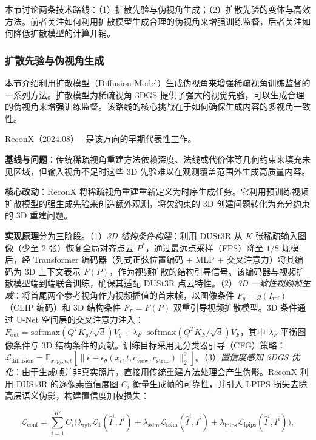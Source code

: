 本节讨论两条技术路线：（1）扩散先验与伪视角生成；（2）扩散先验的变体与高效方法。前者关注如何利用扩散模型生成合理的伪视角来增强训练监督，后者关注如何降低扩散模型的计算开销。

\subsubsection{扩散先验与伪视角生成}

本节介绍利用扩散模型（Diffusion Model）生成伪视角来增强稀疏视角训练监督的一系列方法。扩散模型为稀疏视角 3DGS 提供了强大的视觉先验，可以生成合理的伪视角来增强训练监督。该路线的核心挑战在于如何确保生成内容的多视角一致性。

ReconX（2024.08）~\cite{2408_16767} 是该方向的早期代表性工作。

\textbf{基线与问题}：传统稀疏视角重建方法依赖深度、法线或代价体等几何约束来填充未见区域，但输入视角不足时这些 3D 先验难以在观测覆盖范围外生成高质量内容。

\textbf{核心改动}：ReconX 将稀疏视角重建重新定义为时序生成任务。它利用预训练视频扩散模型的强生成先验来创造额外观测，将欠约束的 3D 创建问题转化为充分约束的 3D 重建问题。

\textbf{实现原理}分为三阶段。（1）\textit{3D 结构条件构建}：利用 DUSt3R 从 $K$ 张稀疏输入图像（少至 2 张）恢复全局对齐点云 $P^*$，通过最远点采样（FPS）降至 $1/8$ 规模后，经 Transformer 编码器（列式正弦位置编码 + MLP + 交叉注意力）将其编码为 3D 上下文表示 $F(P)$，作为视频扩散的结构引导信号。该编码器与视频扩散模型端到端联合训练，确保其适配 DUSt3R 点云特性。（2）\textit{3D 一致性视频帧生成}：将首尾两个参考视角作为视频插值的首末帧，以图像条件 $F_g = g(I_{\mathrm{ref}})$（CLIP 编码）和 3D 结构条件 $F_F = F(P)$ 双重引导视频扩散模型。3D 条件通过 U-Net 空间层的交叉注意力注入：$F_{\mathrm{out}} = \mathrm{softmax}(Q^T K_g / \sqrt{d})V_g + \lambda_F \cdot \mathrm{softmax}(Q^T K_F / \sqrt{d})V_F$，其中 $\lambda_F$ 平衡图像条件与 3D 结构条件的贡献。训练目标采用无分类器引导（CFG）策略：$\mathcal{L}_{\mathrm{diffusion}} = \mathbb{E}_{x, p_\theta, \epsilon, t}[\| \epsilon - \epsilon_\theta(x_t, t, c_{\mathrm{view}}, c_{\mathrm{struc}}) \|_2^2]$。（3）\textit{置信度感知 3DGS 优化}：由于生成帧并非真实照片，直接用传统重建方法处理会产生伪影。ReconX 利用 DUSt3R 的逐像素置信度图 $C_i$ 衡量生成帧的可靠性，并引入 LPIPS 损失去除高层语义伪影，构建置信度加权损失：

\begin{equation*}
\mathcal{L}_{\mathrm{conf}} = \sum_{i=1}^{K'} C_i \bigl( \lambda_{\mathrm{rgb}} \mathcal{L}_1(\hat{I}^i, I^i) + \lambda_{\mathrm{ssim}} \mathcal{L}_{\mathrm{ssim}}(\hat{I}^i, I^i) + \lambda_{\mathrm{lpips}} \mathcal{L}_{\mathrm{lpips}}(\hat{I}^i, I^i) \bigr),
\end{equation*}

